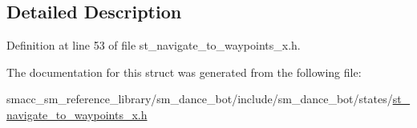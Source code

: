 \subsection{Detailed Description}


Definition at line 53 of file st\+\_\+navigate\+\_\+to\+\_\+waypoints\+\_\+x.\+h.



The documentation for this struct was generated from the following file\+:\begin{DoxyCompactItemize}
\item 
smacc\+\_\+sm\+\_\+reference\+\_\+library/sm\+\_\+dance\+\_\+bot/include/sm\+\_\+dance\+\_\+bot/states/\hyperlink{st__navigate__to__waypoints__x_8h}{st\+\_\+navigate\+\_\+to\+\_\+waypoints\+\_\+x.\+h}\end{DoxyCompactItemize}
